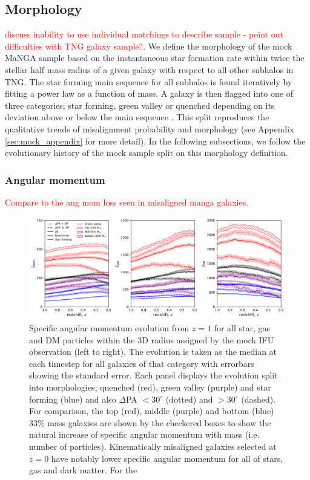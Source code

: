 \documentclass[fleqn,usenatbib]{mnras}
\newcommand{\red}[1]{{\textcolor{red}{#1}}}
\begin{document}
\subsection{Morphology}
\red{discuss inability to use individual matchings to describe sample - point out difficulties with TNG galaxy sample?}. 
We define the morphology of the mock MaNGA sample based on the instantaneous star formation rate within twice the stellar half mass radius of a given galaxy with respect to all other subhalos in TNG. The star forming main sequence for all subhalos is found iteratively by fitting a power law as a function of mass. A galaxy is then flagged into one of three categories; star forming, green valley or quenched depending on its deviation above or below the main sequence \citep{pillepich2019}. This split reproduces the qualitative trends of misalignment probability and morphology (see Appendix \ref{sec:mock_appendix} for more detail). In the following subsections, we follow the evolutionary history of the mock sample split on this morphology definition. 

\subsubsection{Angular momentum}
\red{Compare to the ang mom loss seen in misaligned manga galaxies.}

\begin{figure}
	\includegraphics[width=\linewidth]{tng_results/sJ_evo_mass_control.pdf}
    \caption{Specific angular momentum evolution from $z = 1$ for all star, gas and DM particles within the 3D radius assigned by the mock IFU observation (left to right). The evolution is taken as the median at each timestep for all galaxies of that category with errorbars showing the standard error. Each panel displays the evolution split into morphologies; quenched (red), green valley (purple) and star forming (blue) and also $\Delta$PA $< 30^{\circ}$ (dotted) and $> 30^{\circ}$ (dashed). For comparison, the top (red), middle (purple) and bottom (blue) 33\% mass galaxies are shown by the checkered boxes to show the natural increase of specific angular momentum with mass (i.e. number of particles). Kinematically misaligned galaxies selected at $z=0$ have notably lower specific angular momentum for all of stars, gas and dark matter. For the }
    \label{fig:sJ_evo}
\end{figure}
\end{document}
